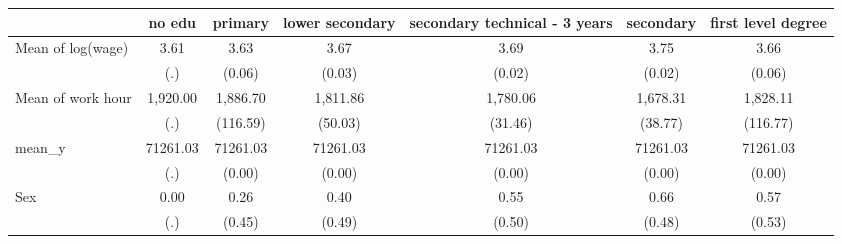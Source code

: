 \begin{tabular}{l*{6}{c}}
\toprule
                &   no edu&  primary&lower secondary&secondary technical - 3 years&secondary&first level degree\\
\midrule
Mean of log(wage)&     3.61&     3.63&     3.67&     3.69&     3.75&     3.66\\
                &      (.)&   (0.06)&   (0.03)&   (0.02)&   (0.02)&   (0.06)\\
\addlinespace
Mean of work hour& 1,920.00& 1,886.70& 1,811.86& 1,780.06& 1,678.31& 1,828.11\\
                &      (.)& (116.59)&  (50.03)&  (31.46)&  (38.77)& (116.77)\\
\addlinespace
mean\_y          & 71261.03& 71261.03& 71261.03& 71261.03& 71261.03& 71261.03\\
                &      (.)&   (0.00)&   (0.00)&   (0.00)&   (0.00)&   (0.00)\\
\addlinespace
Sex             &     0.00&     0.26&     0.40&     0.55&     0.66&     0.57\\
                &      (.)&   (0.45)&   (0.49)&   (0.50)&   (0.48)&   (0.53)\\
\bottomrule
\end{tabular}
